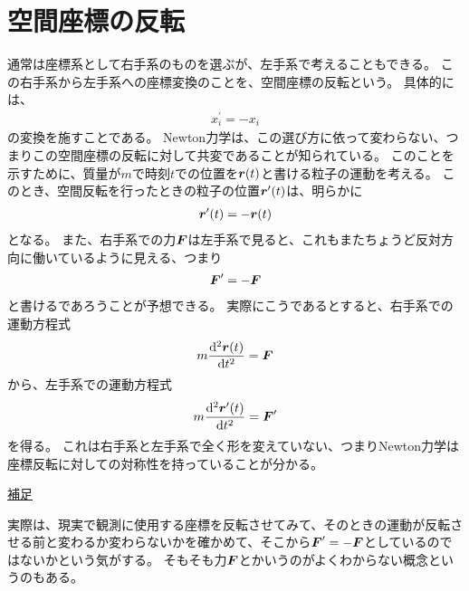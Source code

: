 \documentclass[a4paper]{jsarticle}
\def\vec#1{\mbox{\boldmath $#1$}}
\newcommand{\dif}[2]{\frac{{\rm d} #1}{{\rm d} #2}}
\begin{document}
\section{空間座標の反転}
通常は座標系として右手系のものを選ぶが、左手系で考えることもできる。
この右手系から左手系への座標変換のことを、空間座標の反転という。
具体的には、
\begin{align}
	x^{\prime}_i = -x_i
\end{align}
の変換を施すことである。
Newton力学は、この選び方に依って変わらない、つまりこの空間座標の反転に対して共変であることが知られている。
このことを示すために、質量が$m$で時刻$t$での位置を$\vec{r}(t)$と書ける粒子の運動を考える。
このとき、空間反転を行ったときの粒子の位置$\vec{r}^{\prime}(t)$は、明らかに
\begin{align}
	\vec{r}^{\prime}(t) = -\vec{r}(t)
\end{align}
となる。
また、右手系での力$\vec{F}$は左手系で見ると、これもまたちょうど反対方向に働いているように見える、つまり
\begin{align}
	\vec{F}^{\prime} = -\vec{F}
\end{align}
と書けるであろうことが予想できる。
実際にこうであるとすると、右手系での運動方程式
\begin{align}
	m \dif{^2 \vec{r}(t)}{t^2} = \vec{F}
\end{align}
から、左手系での運動方程式
\begin{align}
	m \dif{^2 \vec{r}^{\prime}(t)}{t^2} = \vec{F}^{\prime}
\end{align}
を得る。
これは右手系と左手系で全く形を変えていない、つまりNewton力学は座標反転に対しての対称性を持っていることが分かる。
\begin{screen}
	\underline{補足}

	実際は、現実で観測に使用する座標を反転させてみて、そのときの運動が反転させる前と変わるか変わらないかを確かめて、そこから$\vec{F}^{\prime} = -\vec{F}$としているのではないかという気がする。
	そもそも力$\vec{F}$とかいうのがよくわからない概念というのもある。
\end{screen}
\end{document}
